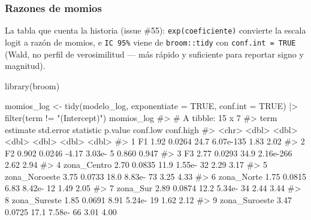 \documentclass[
  spanish,
  letterpaper,
  DIV=11,
  numbers=noendperiod]{scrartcl}
\newenvironment{Shaded}{\begin{snugshade}}{\end{snugshade}}
\newcommand{\AttributeTok}[1]{\textcolor[rgb]{0.40,0.45,0.13}{#1}}
\newcommand{\CommentTok}[1]{\textcolor[rgb]{0.37,0.37,0.37}{#1}}
\newcommand{\ConstantTok}[1]{\textcolor[rgb]{0.56,0.35,0.01}{#1}}
\newcommand{\FunctionTok}[1]{\textcolor[rgb]{0.28,0.35,0.67}{#1}}
\newcommand{\NormalTok}[1]{\textcolor[rgb]{0.00,0.23,0.31}{#1}}
\newcommand{\OtherTok}[1]{\textcolor[rgb]{0.00,0.23,0.31}{#1}}
\newcommand{\SpecialCharTok}[1]{\textcolor[rgb]{0.37,0.37,0.37}{#1}}
\newcommand{\StringTok}[1]{\textcolor[rgb]{0.13,0.47,0.30}{#1}}
\begin{document}
\subsubsection{Razones de momios}\label{razones-de-momios}

La tabla que cuenta la historia (issue \#55): \texttt{exp(coeficiente)}
convierte la escala logit a razón de momios, e \texttt{IC\ 95\%} viene
de \texttt{broom::tidy} con \texttt{conf.int\ =\ TRUE} (Wald, no perfil
de verosimilitud --- más rápido y suficiente para reportar signo y
magnitud).

\begin{Shaded}
\begin{Highlighting}[]
\FunctionTok{library}\NormalTok{(broom)}

\NormalTok{momios\_log }\OtherTok{\textless{}{-}} \FunctionTok{tidy}\NormalTok{(modelo\_log, }\AttributeTok{exponentiate =} \ConstantTok{TRUE}\NormalTok{, }\AttributeTok{conf.int =} \ConstantTok{TRUE}\NormalTok{) }\SpecialCharTok{|\textgreater{}}
    \FunctionTok{filter}\NormalTok{(term }\SpecialCharTok{!=} \StringTok{"(Intercept)"}\NormalTok{)}
\NormalTok{momios\_log}
\CommentTok{\#\textgreater{} \# A tibble: 15 x 7}
\CommentTok{\#\textgreater{}    term                estimate std.error statistic   p.value conf.low conf.high}
\CommentTok{\#\textgreater{}    \textless{}chr\textgreater{}                  \textless{}dbl\textgreater{}     \textless{}dbl\textgreater{}     \textless{}dbl\textgreater{}     \textless{}dbl\textgreater{}    \textless{}dbl\textgreater{}     \textless{}dbl\textgreater{}}
\CommentTok{\#\textgreater{}  1 F1                     1.92     0.0264     24.7  6.07e{-}135    1.83      2.02 }
\CommentTok{\#\textgreater{}  2 F2                     0.902    0.0246     {-}4.17 3.03e{-}  5    0.860     0.947}
\CommentTok{\#\textgreater{}  3 F3                     2.77     0.0293     34.9  2.16e{-}266    2.62      2.94 }
\CommentTok{\#\textgreater{}  4 zona\_Centro            2.70     0.0835     11.9  1.55e{-} 32    2.29      3.17 }
\CommentTok{\#\textgreater{}  5 zona\_Noroeste          3.75     0.0733     18.0  8.83e{-} 73    3.25      4.33 }
\CommentTok{\#\textgreater{}  6 zona\_Norte             1.75     0.0815      6.83 8.42e{-} 12    1.49      2.05 }
\CommentTok{\#\textgreater{}  7 zona\_Sur               2.89     0.0874     12.2  5.34e{-} 34    2.44      3.44 }
\CommentTok{\#\textgreater{}  8 zona\_Sureste           1.85     0.0691      8.91 5.24e{-} 19    1.62      2.12 }
\CommentTok{\#\textgreater{}  9 zona\_Suroeste          3.47     0.0725     17.1  7.58e{-} 66    3.01      4.00 }

\end{Highlighting}
\end{Shaded}
\end{document}
